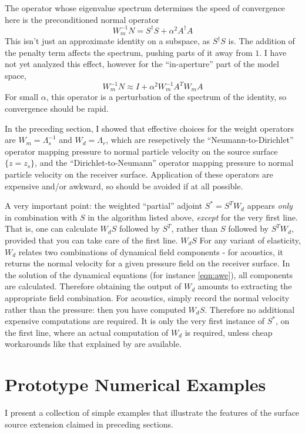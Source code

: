 The operator whose eigenvalue spectrum determines the speed of convergence here is the preconditioned normal operator
\begin{equation}
  \label{eqn:pno}
  W_m^{-1}N = S^{\dagger}S +\alpha^2 A^{\dagger}A
\end{equation}
This isn't just an approximate identity on a subspace, as $S^{\dagger}S$ is. The addition of the penalty term affects the spectrum, pushing parts of it away from $1$. I have not yet analyzed this effect, however for the ``in-aperture'' part of the model space,
\[
  W_m^{-1}N \approx I +\alpha^2 W_m^{-1}A^TW_mA
\]
For small $\alpha$, this operator is a perturbation of the spectrum of the identity, so convergence should be rapid. 

In the preceding section, I showed that effective choices for the weight operators are $W_m = \Lambda_s^{-1}$ and $W_d = \Lambda_r$, which are resepctively the ``Neumann-to-Dirichlet'' operator mapping pressure to normal particle velocity on the source surface $\{z=z_s\}$, and the ``Dirichlet-to-Neumann'' operator mapping pressure to normal particle velocity on the receiver surface. Application of these operators are expensive and/or awkward, so should be avoided if at all possible. 

A very important point: the weighted ``partial'' adjoint $S^*=S^TW_d$ appears {\em only} in combination with $S$ in the algorithm listed above, {\em except} for the very first line. That is, one can calculate $W_dS$ followed by $S^T$, rather than $S$ followed by $S^TW_d$, provided that you can take care of the first line. $W_dS$ For any variant of elasticity, $W_d$ relates two combinations of dynamical field components - for acoustics, it returns the normal velocity for a given pressure field on the receiver surface. In the solution of the dynamical equations (for instance \ref{eqn:awe}), all components are calculated. Therefore obtaining the output of $W_d$ amounts to extracting the appropriate field combination. For acoustics, simply record the normal velocity rather than the pressure: then you have computed $W_dS$. Therefore no additional expensive computations are required. It is only the very first instance of $S^*$, on the first line, where an actual computation of $W_d$ is required, unless cheap workarounds like that explained by \cite{HouSymes:15} are available.

\section{Prototype Numerical Examples}
I present a collection of simple examples that illustrate the features of the surface source extension claimed in preceding sections. 

